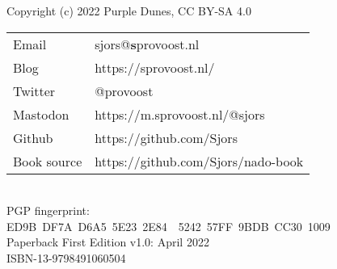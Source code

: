 {\setlength{\parindent}{0cm}
Copyright (c) 2022 Purple Dunes, CC BY-SA 4.0\\

\begin{tabular}{@{} l l }
Email & sjors@\textbf{s}provoost.nl \\
Blog & https://sprovoost.nl/ \\
Twitter & @provoost \\
Mastodon & https://m.sprovoost.nl/@sjors \\
Github & https://github.com/Sjors \\
Book source & https://github.com/Sjors/nado-book \\
\end{tabular}
\\

PGP fingerprint:\\
ED9B DF7A D6A5 5E23 2E84  5242 57FF 9BDB CC30 1009\\

Paperback First Edition v1.0: April 2022\\

ISBN-13-9798491060504\\
}
\newpage
